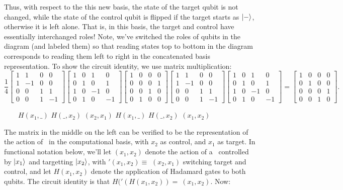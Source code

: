 Thus, with respect to the this new basis, the state of the target qubit is not changed, while the state of the control qubit is flipped if the target starts as $\ket{-}$, otherwise it is left alone. That is, in this basis, the target and control have essentially interchanged roles!
\Soln Note, we've switched the roles of qubits in the diagram (and labeled them)  so that reading states top to bottom in the diagram corresponds to reading them left to right in the concatenated basis representation.  To show the circuit identity, we use matrix multiplication:
$$\frac{1}{4} \begin{bmatrix} 1 & 1 & 0 & 0 \\ 1 & -1 & 0 & 0 \\ 0 & 0 & 1 & 1 \\ 0 & 0 & 1 & -1\end{bmatrix}\begin{bmatrix} 1 & 0 & 1 & 0 \\ 0 & 1 & 0 & 1 \\ 1 & 0 & -1 & 0 \\ 0 & 1 & 0 & -1\end{bmatrix} \begin{bmatrix} 1 & 0 & 0 &0 \\ 0 & 0 & 0 & 1 \\ 0 & 0 & 1 & 0 \\ 0 & 1 & 0 & 0\end{bmatrix}\begin{bmatrix} 1 & 1 & 0 & 0 \\ 1 & -1 & 0 & 0 \\ 0 & 0 & 1 & 1 \\ 0 & 0 & 1 & -1\end{bmatrix}\begin{bmatrix} 1 & 0 & 1 & 0 \\ 0 & 1 & 0 & 1 \\ 1 & 0 & -1 & 0 \\ 0 & 1 & 0 & -1\end{bmatrix} =\begin{bmatrix} 1 & 0 & 0 &0 \\ 0 & 1 & 0 & 0 \\ 0 & 0 & 0 & 1 \\ 0 & 0 & 1 & 0\end{bmatrix}.$$
\vspace{-15pt}
\begin{center}\ \ \ \ $H(x_1,\_)$ \quad\quad\quad\quad $H(\_, x_2)$  \quad\quad \CNOT$(x_2,x_1)$ \quad\quad $H(x_1,\_)$ \quad\quad\quad $H(\_, x_2)$ \quad\quad\quad \CNOT$(x_1,x_2)$ \end{center}
The matrix in the middle on the left can be verified to be the representation of the action of \CNOT\ in the computational basis, with $x_2$ as control, and $x_1$  as target.  In functional notation below, we'll let \CNOT$(x_1, x_2)$ denote the action of a \CNOT\ controlled by $\ket{x_1}$ and targetting $\ket{x_2}$, with \CNOT$'(x_1,x_2) \equiv$ \CNOT$(x_2,x_1)$ switching target and control, and let $H(x_1, x_2)$ denote the application of Hadamard gates to both qubits.  The circuit identity is that $H($\CNOT$'(H(x_1, x_2)) =\ $\CNOT$(x_1,x_2)$.  Now:

